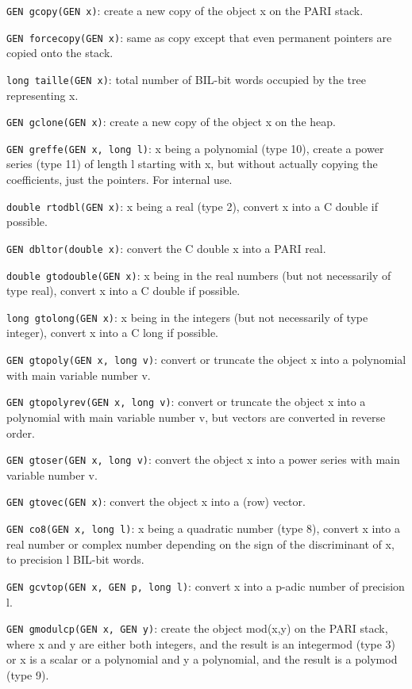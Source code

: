 {\tt GEN gcopy(GEN x)}: create a new copy of the object x on the PARI stack.

{\tt GEN forcecopy(GEN x)}: same as copy except that even permanent pointers
are copied onto the stack.

{\tt long taille(GEN x)}: total number of BIL-bit words occupied by the tree
representing x.

{\tt GEN gclone(GEN x)}: create a new copy of the object x on the heap.

{\tt GEN greffe(GEN x, long l)}: x being a polynomial (type 10), create a
power series (type 11) of length l starting with x, but without actually
copying the coefficients, just the pointers. For internal use.

{\tt double rtodbl(GEN x)}: x being a real (type 2), convert x into a
C double if possible.

{\tt GEN dbltor(double x)}: convert the C double x into a PARI real.

{\tt double gtodouble(GEN x)}: x being in the real numbers (but not 
necessarily of type real), convert x into a C double if possible. 

{\tt long gtolong(GEN x)}: x being in the integers (but not necessarily of type
integer), convert x into a C long if possible.

{\tt GEN gtopoly(GEN x, long v)}: convert or truncate the object x into a 
polynomial with main variable number v.

{\tt GEN gtopolyrev(GEN x, long v)}: convert or truncate the object x into a 
polynomial with main variable number v, but vectors are converted in reverse
order.

{\tt GEN gtoser(GEN x, long v)}: convert the object x into a power series
with main variable number v.

{\tt GEN gtovec(GEN x)}: convert the object x into a (row) vector.

{\tt GEN co8(GEN x, long l)}: x being a quadratic number (type 8), convert x
into a real number or complex number depending on the sign of the discriminant
of x, to precision l BIL-bit words.

{\tt GEN gcvtop(GEN x, GEN p, long l)}: convert x into a p-adic number of
precision l.

{\tt GEN gmodulcp(GEN x, GEN y)}: create the object mod(x,y) on the PARI stack,
where x and y are either both integers, and the result is an integermod 
(type 3) or x is a scalar or a polynomial and y a polynomial, and the result is
a polymod (type 9).

